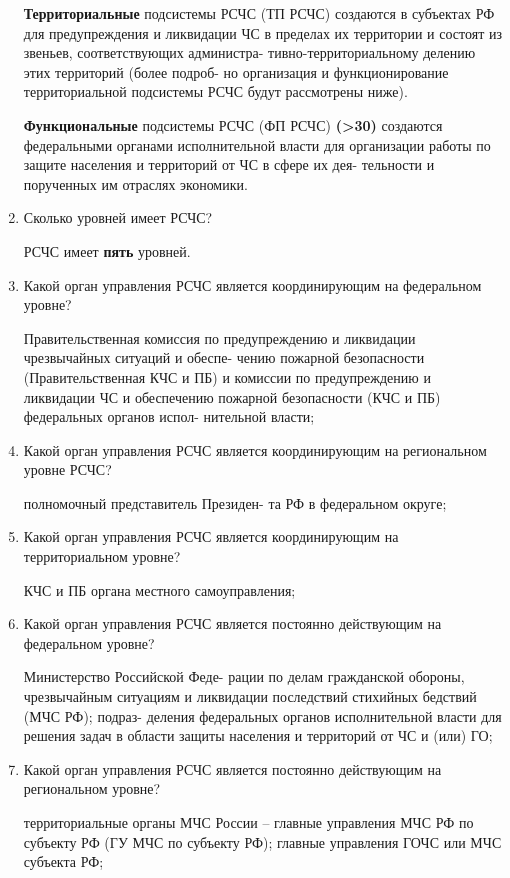 \documentclass[oneside,final,14pt]{extreport}
\begin{document}
\begin{enumerate}
	\textbf{Территориальные} подсистемы РСЧС (ТП РСЧС) создаются
	в субъектах РФ для предупреждения и ликвидации ЧС в пределах
	их территории и состоят из звеньев, соответствующих администра-
	тивно-территориальному делению этих территорий (более подроб-
	но организация и функционирование территориальной подсистемы
	РСЧС будут рассмотрены ниже).
	
	\textbf{Функциональные} подсистемы РСЧС (ФП РСЧС) \textbf{(>30)} создаются
	федеральными органами исполнительной власти для организации
	работы по защите населения и территорий от ЧС в сфере их дея-
	тельности и порученных им отраслях экономики.
	
	\item  Сколько уровней имеет РСЧС?
	
	РСЧС имеет \textbf{пять} уровней.
	
	\item  Какой орган управления РСЧС является координирующим на федеральном уровне?
	
	Правительственная комиссия по
	предупреждению и ликвидации чрезвычайных ситуаций и обеспе-
	чению пожарной безопасности (Правительственная КЧС и ПБ) и
	комиссии по предупреждению и ликвидации ЧС и обеспечению
	пожарной безопасности (КЧС и ПБ) федеральных органов испол-
	нительной власти;
	
	\item  Какой орган управления РСЧС является координирующим на региональном уровне РСЧС?
	
	полномочный представитель Президен-
	та РФ в федеральном округе;
	
	\item  Какой орган управления РСЧС является координирующим на территориальном уровне?
	
	КЧС и ПБ органа местного самоуправления;
	
	\item  Какой орган управления РСЧС является постоянно действующим на федеральном уровне?
	
	Министерство Российской Феде-
	рации по делам гражданской обороны, чрезвычайным ситуациям и
	ликвидации последствий стихийных бедствий (МЧС РФ); подраз-
	деления федеральных органов исполнительной власти для решения
	задач в области защиты населения и территорий от ЧС и (или) ГО;
	
	\item  Какой орган управления РСЧС является постоянно действующим на региональном уровне?
	
	территориальные органы МЧС
	России – главные управления МЧС РФ по субъекту РФ (ГУ МЧС по
	субъекту РФ); главные управления ГОЧС или МЧС субъекта РФ;
	

\end{enumerate}
\end{document}
